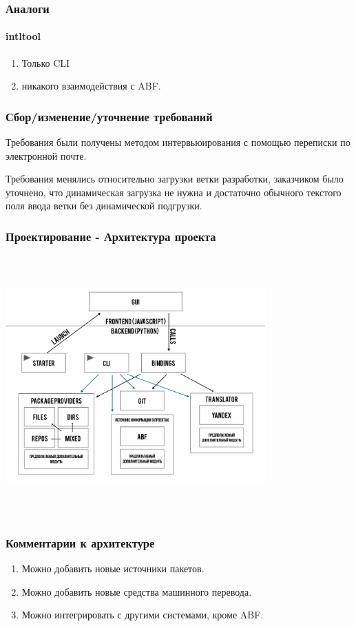\documentclass{beamer}
\begin{document}
		
		\begin{frame}
			\frametitle{Аналоги}
			\framesubtitle{intltool}
			\begin{enumerate}
				\item 	Только CLI
				\item			никакого взаимодействия с ABF.
			\end{enumerate}
		\end{frame}
		
\begin{frame}
	\frametitle{Сбор/изменение/уточнение требований}
	Требования были получены методом интервьюирования с помощью переписки по электронной почте.
	
	Требования менялись относительно загрузки ветки разработки, заказчиком было уточнено, что динамическая загрузка не 
	нужна и достаточно обычного текстого поля ввода ветки без динамической подгрузки.
\end{frame}
	


\begin{frame}
	\frametitle{Проектирование - Архитектура проекта}
	
	\includegraphics[width=10cm,height=10cm,keepaspectratio]{diagram.png}
\end{frame}

\begin{frame}
	\frametitle{Комментарии к архитектуре}
	\begin{enumerate}
		\item Можно добавить новые источники пакетов.
		\item Можно добавить новые средства машинного перевода.
		\item Можно интегрировать с другими системами, кроме ABF.
\end{enumerate}
\end{frame}
\end{document}
